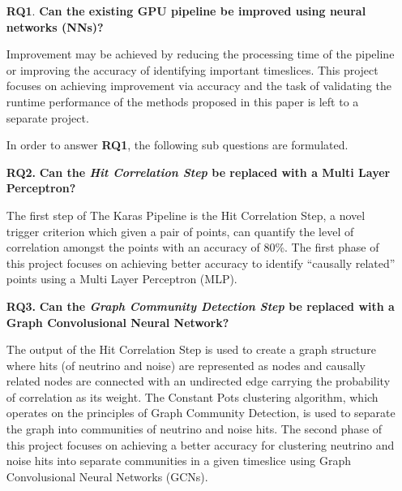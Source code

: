 \begin{enumerate}
  \item[\textbf{RQ1}.] \textbf{Can the existing GPU pipeline be improved using neural networks (NNs)?}

    Improvement may be achieved by reducing the processing time of the
    pipeline or improving the accuracy of identifying important
    timeslices. This project focuses on achieving improvement via
    accuracy and the task of validating the runtime performance of the
    methods proposed in this paper is left to a separate project.

    In order to answer \textbf{RQ1}, the following sub questions are
    formulated.

  \item[\textbf{RQ2.}] \textbf{Can the \emph{Hit Correlation Step} be replaced with a Multi Layer Perceptron?}

    The first step of The Karas Pipeline is the Hit Correlation Step,
    a novel trigger criterion which given a pair of points, can
    quantify the level of correlation amongst the points with an
    accuracy of 80\%. The first phase of this project focuses on
    achieving better accuracy to identify ``causally related'' points
    using a Multi Layer Perceptron (MLP).
    
  \item[\textbf{RQ3.}] \textbf{Can the \emph{Graph Community Detection Step} be replaced with a Graph Convolusional Neural Network?}

    The output of the Hit Correlation Step is used to create a graph
    structure where hits (of neutrino and noise) are represented as
    nodes and causally related nodes are connected with an undirected
    edge carrying the probability of correlation as its weight. The
    Constant Pots clustering algorithm, which operates on the
    principles of Graph Community Detection, is used to separate the
    graph into communities of neutrino and noise hits. The second
    phase of this project focuses on achieving a better accuracy for
    clustering neutrino and noise hits into separate communities in a
    given timeslice using Graph Convolusional Neural Networks (GCNs).
\end{enumerate}

